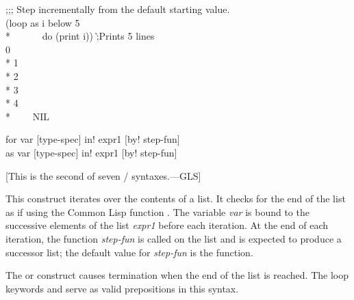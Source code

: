 \begin{defloop}
\begin{lisp}
;;; Step incrementally from the default starting value. \\[3pt]
(loop as i below 5 \\*
~~~~~~do (print i)) \`;{\rm Prints 5 lines} \\
0 \\*
1 \\*
2 \\*
3 \\*
4 \\*
~~~\EV~NIL
\end{lisp}
\end{defloop}

\begin{defloop}
for var [type-spec] \!in! expr1 [\!by! step-fun] \\
as var [type-spec] \!in! expr1 [\!by! step-fun]

[This is the second of seven / syntaxes.---GLS]

This construct iterates over the contents of a list.  It checks for 
the end of the list as if using the Common Lisp function .  
The variable {\it var\/} is bound to the successive elements  of 
the list {\it expr1\/} before each
iteration.  At the end of each iteration, the function {\it step-fun\/}
is called on the list and is expected to produce a successor list;
the default value for {\it step-fun\/} is the  function.

The  or  construct causes termination when the
end of the list is reached.
The loop keywords  and  serve as valid prepositions in
this syntax.


\end{defloop}
